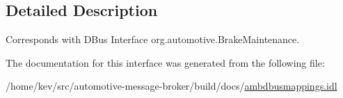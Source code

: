\subsection{Detailed Description}
Corresponds with D\+Bus Interface org.\+automotive.\+Brake\+Maintenance. 

The documentation for this interface was generated from the following file\+:\begin{DoxyCompactItemize}
\item 
/home/kev/src/automotive-\/message-\/broker/build/docs/\hyperlink{ambdbusmappings_8idl}{ambdbusmappings.\+idl}\end{DoxyCompactItemize}
